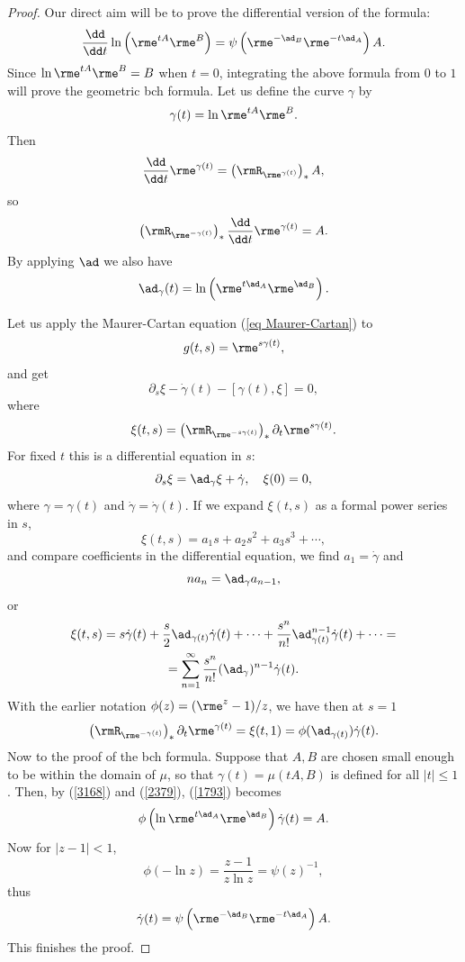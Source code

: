 \begin{proof}
    Our direct aim will be to prove the differential version of the formula:
    \[\frac{\dd}{\dd t}\ln\left(\rme^{tA} \rme^B\right)=\psi\left(\rme^{-\ad_B}\rme^{-t\ad_A}\right)A.\]
    Since $\ln \rme^{tA} \rme^{B}=B$ when $t=0$, integrating the above formula from $0$ to $1$ will prove the geometric \gls{bch} formula. Let us define the curve $\gamma$ by
    \[\gamma(t)=\ln \rme^{tA} \rme^{B}.\]
    Then
    \[\frac{\dd}{\dd t} \rme^{\gamma(t)}=\left(\rmR_{\rme^{\gamma(t)}}\right)_\ast A,\]
    so
    \[\left(\rmR_{\rme^{-\gamma(t)}}\right)_\ast\frac{\dd}{\dd t}\rme^{\gamma(t)}=A.\label{2379}\]
    By applying $\ad$ we also have
    \[\ad_\gamma(t)=\ln\left(\rme^{t\ad_A}\rme^{\ad_{B}}\right).\label{3168}\]
    
    Let us apply the Maurer-Cartan equation (\ref{eq Maurer-Cartan}) to
    \[g(t,s)=\rme^{s\gamma(t)},\]
    and get 
    \[\partial_s \xi-\dot\gamma(t)-[\gamma(t),\xi]=0,\]
    where 
    \[\xi(t,s)=\left(\rmR_{\rme^{-s\gamma(t)}}\right)_\ast\partial_t \rme^{s\gamma(t)}.\]
    For fixed $t$ this is a differential equation in $s$:
    \[\partial_s\xi=\ad_\gamma\xi+\dot\gamma,\quad \xi(0)=0,\]
    where $\gamma=\gamma(t)$ and $\dot\gamma=\dot\gamma(t)$. If we expand $\xi(t,s)$ as a formal power series in $s$,
    \[\xi(t,s)=a_1s+a_2s^2+a_3s^3+\cdots,\]
    and compare coefficients in the differential equation, we find $a_1=\dot\gamma$ and 
    \[na_n=\ad_\gamma a_{n-1},\]
    or 
    \begin{multline}
        \xi(t,s)=s\dot\gamma(t)+\frac{s}{2}\ad_{\gamma(t)}\dot\gamma(t)+\cdots+\frac{s^n}{n!}\ad_{\gamma(t)}^{n-1}\dot\gamma(t)+\cdots=\\=\sum_{n=1}^\infty \frac{s^n}{n!}(\ad_\gamma)^{n-1}\dot\gamma(t).
    \end{multline}
    With the earlier notation $\phi(z)=(\rme^z-1)/z$, we have then at $s=1$
    \[\left(\rmR_{\rme^{-\gamma(t)}}\right)_\ast \partial_t \rme^{\gamma(t)}=\xi(t,1)=\phi(\ad_{\gamma(t)})\dot\gamma(t).\label{1793}\]
    Now to the proof of the \gls{bch} formula. Suppose that $A,B$ are chosen small enough to be within the domain of $\mu$, so that $\gamma(t)=\mu(tA,B)$ is defined for all $|t|\leq 1$. Then, by (\ref{3168}) and (\ref{2379}), (\ref{1793}) becomes
    \[\phi\left(\ln \rme^{t\ad_A}\rme^{\ad_B}\right)\dot\gamma(t)=A.\]
    Now for $|z-1|<1$,
    \[\phi(-\ln z)=\frac{z-1}{z\ln z}=\psi(z)^{-1},\]
    thus
    \[\dot\gamma(t)=\psi\left(\rme^{-\ad_B}\rme^{-t\ad_A}\right)A.\]
    This finishes the proof.
\end{proof}





